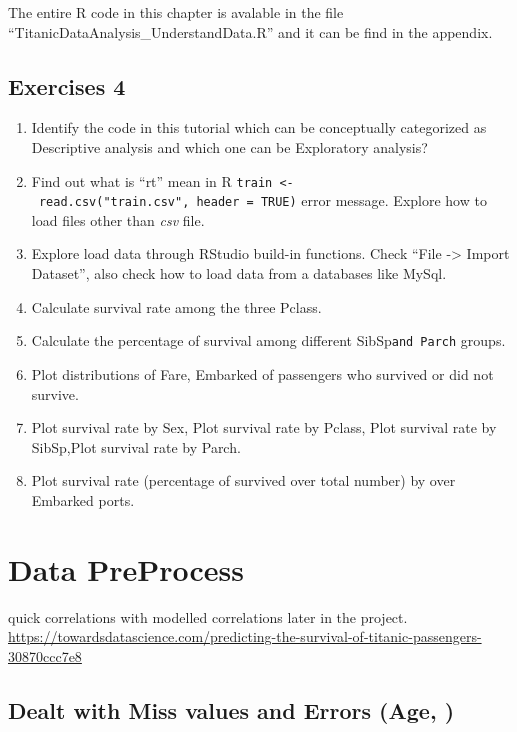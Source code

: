 \documentclass[
]{book}
\makeatletter
\newenvironment{kframe}{%
\medskip{}
\setlength{\fboxsep}{.8em}
 \def\at@end@of@kframe{}%
 \ifinner\ifhmode%
  \def\at@end@of@kframe{\end{minipage}}%
  \begin{minipage}{\columnwidth}%
 \fi\fi%
 \def\FrameCommand##1{\hskip\@totalleftmargin \hskip-\fboxsep
 \colorbox{shadecolor}{##1}\hskip-\fboxsep
     \hskip-\linewidth \hskip-\@totalleftmargin \hskip\columnwidth}%
 \MakeFramed {\advance\hsize-\width
   \@totalleftmargin\z@ \linewidth\hsize
   \@setminipage}}%
 {\par\unskip\endMakeFramed%
 \at@end@of@kframe}
\newenvironment{rmdblock}[1]
  {
  \begin{itemize}
  \renewcommand{\labelitemi}{
    \raisebox{-.7\height}[0pt][0pt]{
      {\setkeys{Gin}{width=3em,keepaspectratio}\texttt{[image: images/\#1]}}
    }
  }
  \setlength{\fboxsep}{1em}
  \begin{kframe}
  \item
  }
  {
  \end{kframe}
  \end{itemize}
  }
\newenvironment{rmdinfo}
  {\begin{rmdblock}{info}}
  {\end{rmdblock}}
\makeatother
\begin{document}
\begin{rmdinfo}
The entire R code in this chapter is avalable in the file ``TitanicDataAnalysis\_UnderstandData.R'' and it can be find in the appendix.
\end{rmdinfo}

\hypertarget{exercises-4}{%
\section*{Exercises 4}\label{exercises-4}}


\begin{enumerate}
\def\labelenumi{\arabic{enumi}.}
\item
  Identify the code in this tutorial which can be conceptually categorized as Descriptive analysis and which one can be Exploratory analysis?
\item
  Find out what is ``rt'' mean in R \texttt{train\ \textless{}-\ read.csv("train.csv",\ header\ =\ TRUE)} error message. Explore how to load files other than \emph{csv} file.
\item
  Explore load data through RStudio build-in functions. Check ``File -\textgreater{} Import Dataset'', also check how to load data from a databases like MySql.
\item
  Calculate survival rate among the three Pclass.
\item
  Calculate the percentage of survival among different SibSp\texttt{and\ Parch} groups.
\item
  Plot distributions of Fare, Embarked of passengers who survived or did not survive.
\item
  Plot survival rate by Sex, Plot survival rate by Pclass, Plot survival rate by SibSp,Plot survival rate by Parch.
\item
  Plot survival rate (percentage of survived over total number) by over Embarked ports.
\end{enumerate}

\hypertarget{data-preprocess}{%
\chapter{Data PreProcess}\label{data-preprocess}}

quick correlations with modelled correlations later in the project.
\url{https://towardsdatascience.com/predicting-the-survival-of-titanic-passengers-30870ccc7e8}

\hypertarget{dealt-with-miss-values-and-errors-age}{%
\section{Dealt with Miss values and Errors (Age, )}\label{dealt-with-miss-values-and-errors-age}}
\end{document}
